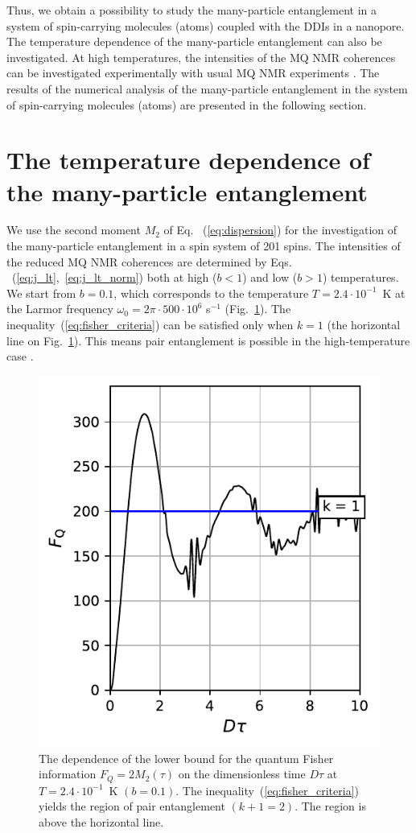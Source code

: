 \documentclass[%
 reprint,
superscriptaddress,
 amsmath,amssymb,
]{revtex4-2}
\begin{document}
Thus, we obtain a possibility to study the many-particle entanglement in a system of spin-carrying molecules (atoms) coupled with the DDIs in a nanopore.
The temperature dependence of the many-particle entanglement can also be investigated. 
At high temperatures, the intensities of the MQ NMR coherences can be investigated experimentally with usual MQ NMR experiments \cite{mq_nmr_experiment}. The results of the numerical analysis of the many-particle entanglement in the system of spin-carrying molecules (atoms) are presented in the following section.


\section{The temperature dependence of the many-particle entanglement}
\label{sec:entanglement}
We use  the second moment $M_2$ of Eq. ~(\ref{eq:dispersion}) for the investigation of the many-particle entanglement in a spin system of 201 spins. 
The intensities of the reduced MQ NMR coherences are determined by Eqs.  ~(\ref{eq:j_lt},~\ref{eq:j_lt_norm}) both at high ($b < 1$) and low ($b > 1$) temperatures. 
We start from $b = 0.1$, which corresponds to the temperature ${T= 2.4\cdot 10^{-1}}$~K at the Larmor frequency $\omega_0 = 2\pi\cdot 500\cdot10^6$ s$^{-1}$ (Fig.~\ref{fig:m2_t_b01}). 
The inequality~(\ref{eq:fisher_criteria}) can be satisfied only when $k=1$ (the horizontal line on Fig.~\ref{fig:m2_t_b01}). 
This means pair entanglement is possible in the high-temperature case \cite{lab:mq_mnr_qinfo_2012}. 
\begin{figure}
    \centering
    \includegraphics{m2_t_b01.pdf}
    \caption{The dependence of the lower bound for the quantum Fisher information $F_Q = 2M_2(\tau)$ on the dimensionless time $D\tau$ at ${T=2.4\cdot10^{-1}}$~K $(b=0.1)$. 
    The inequality~(\ref{eq:fisher_criteria}) yields the region of pair entanglement $(k+1=2)$. The region is above the horizontal line. 
    }
    \label{fig:m2_t_b01}
\end{figure}
\end{document}
